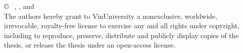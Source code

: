 \thispagestyle{empty}
\begin{center}
\vspace*{\fill}
{\copyright~ \textit{\firstAuthor}, \textit{\secondAuthor}, and \textit{\thirdAuthor}}\\
The authors hereby grant to VinUniversity a nonexclusive, worldwide, irrevocable, royalty-free
license to exercise any and all rights under copyright, including to reproduce, preserve,
distribute and publicly display copies of the thesis, or release the thesis under an
open-access license.



\vspace*{\fill} 
\end{center}